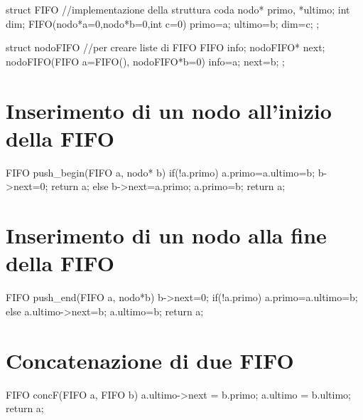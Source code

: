\begin{codice}
struct FIFO { //implementazione della struttura coda
    nodo* primo, *ultimo; 
    int dim; 
    FIFO(nodo*a=0,nodo*b=0,int c=0){
        primo=a; ultimo=b; dim=c;}
};

struct nodoFIFO{ //per creare liste di FIFO
    FIFO info; 
    nodoFIFO* next; 
    nodoFIFO(FIFO a=FIFO(), nodoFIFO*b=0){
        info=a; next=b;}
};
\end{codice}

\section{Inserimento di un nodo all'inizio della FIFO}

\begin{codice}
FIFO push_begin(FIFO a, nodo* b){
    if(!a.primo){
        a.primo=a.ultimo=b; 
        b->next=0; return a;
    }
    else{
        b->next=a.primo;
        a.primo=b;
        return a;
        }
}

\end{codice}

\section{Inserimento di un nodo alla fine della FIFO}

\begin{codice}
FIFO push_end(FIFO a, nodo*b){
	b->next=0;
	if(!a.primo)
        a.primo=a.ultimo=b;
    else{
        a.ultimo->next=b; 
        a.ultimo=b;
        }
	return a;
}
\end{codice}

\section{Concatenazione di due FIFO}
\begin{codice}
FIFO concF(FIFO a, FIFO b){
	a.ultimo->next = b.primo;
	a.ultimo = b.ultimo;
	return a;
}
\end{codice}
